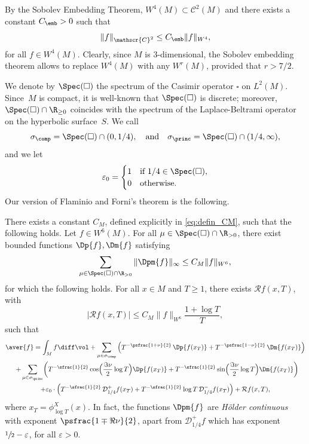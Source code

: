 By the Sobolev Embedding Theorem, $W^4(M) \subset \mathscr{C}^2(M)$ and there exists a constant $C_{\emb}>0$ such that
\[
\|f\|_{\mathscr{C}^2} \leq C_{\emb} \|f\|_{W^4},
\]
for all $f \in W^4(M)$. Clearly, since $M$ is 3-dimensional, the Sobolev embedding theorem allows to replace $W^4(M)$ with any $W^r(M)$, provided that $r > 7/2$.

We denote by $\Spec(\square)$ the spectrum of the Casimir operator $\square$ on $L^2(M)$.
Since~$M$ is compact, it is well-known that $\Spec(\square)$ is discrete; moreover, $\Spec(\square) \cap \R_{\geq 0}$ coincides with the spectrum of the Laplace-Beltrami operator on the hyperbolic surface~$S$. We call
\[
\sigma_{\comp} = \Spec(\square) \cap (0,1/4), \quad\text{and}\quad \sigma_{\princ} = \Spec(\square) \cap (1/4, \infty),
\]
and we let
\[
\varepsilon_0 =
\begin{cases}
1 & \text{if } 1/4 \in \Spec(\square),\\
0 & \text{otherwise}.
\end{cases}
\]
Our version of Flaminio and Forni's theorem is the following.
\begin{theorem}\label{thm:main_FF}
There exists a constant $C_M$, defined explicitly in \eqref{eq:defin_CM}, such that the following holds. Let $f \in W^6(M)$. For all $\mu \in \Spec(\square) \cap \R_{>0}$, there exist bounded functions $\Dp{f}, \Dm{f}$ satisfying
\[
\sum_{\mu \in \Spec(\square) \cap \R_{>0}} \|\Dpm{f}\|_{\infty} \leq C_M \|f \|_{W^6},
\]
for which the following holds. For all $x \in M$ and $T \geq 1$, there exists $\mathcal{R}f(x,T)$, with
\[
|\mathcal{R}f(x,T)|\leq C_M \|f \|_{W^6} \frac{1+ \log T}{T},
\]
such that
\begin{multline*}
\aver{f} = \int_M f \diff \vol + \sum_{\mu \in \sigma_{\comp}} \left(T^{-\psfrac{1+\nu}{2}} \, \Dp{f(x_T) } + T^{-\psfrac{1-\nu}{2}} \, \Dm{ f(x_T)} \right)\\
\shoveright{+ \sum_{\mu \in \sigma_{\princ}}\biggl(T^{-\sfrac{1}{2}} \cos\Bigl(\frac{\Im\nu}{2} \log T \Bigr) \Dp{ f(x_T)} + T^{-\sfrac{1}{2}} \sin\Bigl(\frac{\Im\nu}{2} \log T \Bigr) \Dm{ f(x_T)} \biggr)} \\
+ \varepsilon_0 \cdot \left(T^{-\sfrac{1}{2}} \, \mathcal{D}^{+}_{1/4} f(x_T) + T^{-\sfrac{1}{2}} \log T \, \mathcal{D}^{-}_{1/4} f(x_T) \right) + \mathcal{R}f(x,T),
\end{multline*}
where $x_T= \phi^X_{\log T}(x)$. In fact, the functions $\Dpm{f}$ are \emph{Hölder continuous} with exponent $\psfrac{1 \mp \Re\nu}{2}$, apart from $\mathcal{D}^{+}_{1/4}f$ which has exponent $\sfrac{1}{2}- \varepsilon$, for all $\varepsilon >0$.
\end{theorem}

